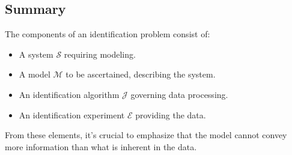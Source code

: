 \subsection{Summary}
The components of an identification problem consist of:
\begin{itemize}
    \item A system $\mathcal{S}$ requiring modeling.
    \item A model $\mathcal{M}$ to be ascertained, describing the system.
    \item An identification algorithm $\mathcal{J}$ governing data processing.
    \item An identification experiment $\mathcal{E}$ providing the data.
\end{itemize}
From these elements, it's crucial to emphasize that the model cannot convey more information than what is inherent in the data.